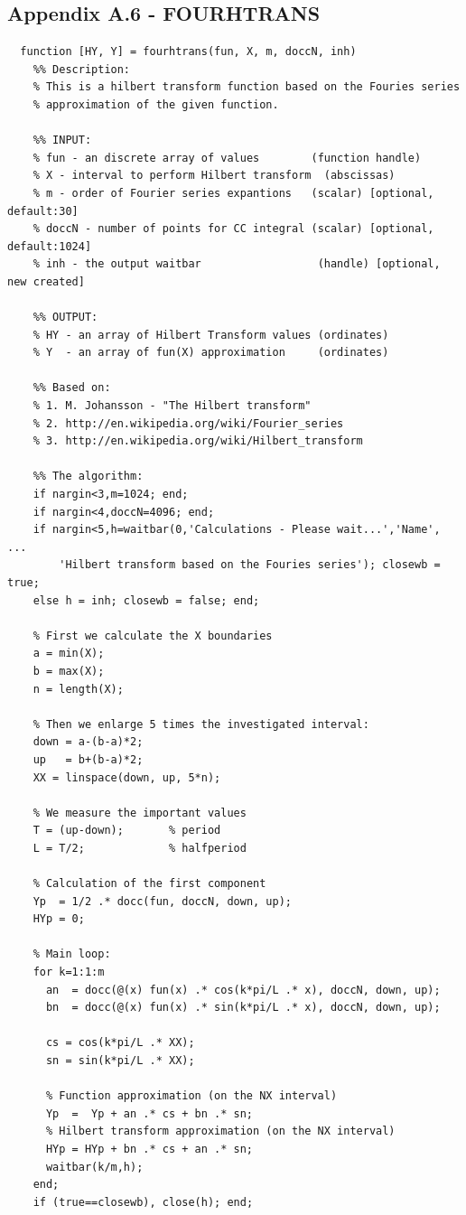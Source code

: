 \documentclass[12pt,twoside,a4paper]{article}
\numberwithin{equation}{subsection}
\numberwithin{figure}{subsection}
\begin{document}
\subsection*{Appendix A.6 - FOURHTRANS}
\begin{lstlisting}
  function [HY, Y] = fourhtrans(fun, X, m, doccN, inh)
    %% Description: 
    % This is a hilbert transform function based on the Fouries series
    % approximation of the given function.

    %% INPUT:
    % fun - an discrete array of values        (function handle)
    % X - interval to perform Hilbert transform  (abscissas)
    % m - order of Fourier series expantions   (scalar) [optional, default:30]
    % doccN - number of points for CC integral (scalar) [optional, default:1024]
    % inh - the output waitbar                  (handle) [optional, new created]

    %% OUTPUT:
    % HY - an array of Hilbert Transform values (ordinates)
    % Y  - an array of fun(X) approximation     (ordinates)

    %% Based on:
    % 1. M. Johansson - "The Hilbert transform"
    % 2. http://en.wikipedia.org/wiki/Fourier_series
    % 3. http://en.wikipedia.org/wiki/Hilbert_transform

    %% The algorithm:
    if nargin<3,m=1024; end;
    if nargin<4,doccN=4096; end;
    if nargin<5,h=waitbar(0,'Calculations - Please wait...','Name', ...
    	'Hilbert transform based on the Fouries series'); closewb = true;
    else h = inh; closewb = false; end;

    % First we calculate the X boundaries
    a = min(X);       
    b = max(X);
    n = length(X);

    % Then we enlarge 5 times the investigated interval:
    down = a-(b-a)*2; 
    up   = b+(b-a)*2;
    XX = linspace(down, up, 5*n);

    % We measure the important values
    T = (up-down);       % period
    L = T/2;             % halfperiod

    % Calculation of the first component
    Yp  = 1/2 .* docc(fun, doccN, down, up);
    HYp = 0;

    % Main loop:
    for k=1:1:m
      an  = docc(@(x) fun(x) .* cos(k*pi/L .* x), doccN, down, up);
      bn  = docc(@(x) fun(x) .* sin(k*pi/L .* x), doccN, down, up);

      cs = cos(k*pi/L .* XX);
      sn = sin(k*pi/L .* XX);

      % Function approximation (on the NX interval)
      Yp  =  Yp + an .* cs + bn .* sn;
      % Hilbert transform approximation (on the NX interval)
      HYp = HYp + bn .* cs + an .* sn;
      waitbar(k/m,h);
    end; 
    if (true==closewb), close(h); end;


\end{lstlisting}
\end{document}
